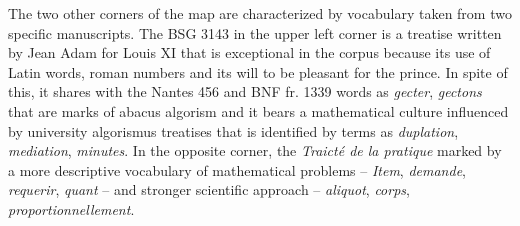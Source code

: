 \documentclass[preprint]{elsarticle}
\begin{document}
The two other corners of the map are characterized by vocabulary taken from two specific manuscripts. The BSG 3143 in the upper left corner is a treatise written by Jean Adam for Louis XI that is exceptional in the corpus because its use of Latin words, roman numbers and its will to be pleasant for the prince. In spite of this, it shares with the Nantes 456 and BNF fr. 1339 words as \textit{gecter}, \textit{gectons} that are marks of abacus algorism and it bears a mathematical culture influenced by university algorismus treatises that is identified by terms as \textit{duplation}, \textit{mediation}, \textit{minutes}. In the opposite corner, the \textit{Traicté de la pratique} marked by a more descriptive vocabulary of mathematical problems – \textit{Item}, \textit{demande}, \textit{requerir}, \textit{quant} – and stronger scientific approach – \textit{aliquot}, \textit{corps}, \textit{proportionnellement}.\\




\end{document}
